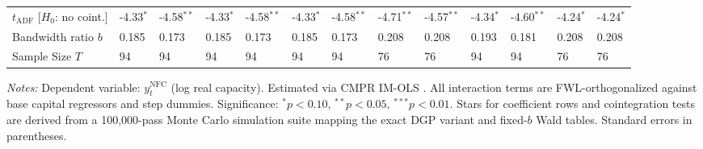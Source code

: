 \begin{table}[h!]
\begin{tabular}{p{3.2cm}p{1.0cm}p{1.0cm}p{1.0cm}p{1.0cm}p{1.0cm}p{1.0cm}p{1.0cm}p{1.0cm}p{1.0cm}p{1.0cm}p{1.0cm}p{1.0cm}}
		$t_{\text{ADF}}$ [$H_0$: no coint.] & -4.33$^{*}$ & -4.58$^{**}$ & -4.33$^{*}$ & -4.58$^{**}$ & -4.33$^{*}$ & -4.58$^{**}$ & -4.71$^{**}$ & -4.57$^{**}$ & -4.34$^{*}$ & -4.60$^{**}$ & -4.24$^{*}$ & -4.24$^{*}$ \\
		Bandwidth ratio $b$ & 0.185 & 0.173 & 0.185 & 0.173 & 0.185 & 0.173 & 0.208 & 0.208 & 0.193 & 0.181 & 0.208 & 0.208 \\
		Sample Size $T$ & 94 & 94 & 94 & 94 & 94 & 94 & 76 & 76 & 94 & 94 & 76 & 76 \\
		\bottomrule
	\end{tabular}
	\begin{minipage}{\textwidth}
		\scriptsize
		\textit{Notes:} Dependent variable: $y_t^{\text{NFC}}$ (log real capacity). Estimated via CMPR IM-OLS \citep{VogelsangWagner2024}. All interaction terms are FWL-orthogonalized against base capital regressors and step dummies. Significance: $^*p<0.10$, $^{**}p<0.05$, $^{***}p<0.01$. Stars for coefficient rows and cointegration tests are derived from a 100,000-pass Monte Carlo simulation suite mapping the exact DGP variant and fixed-$b$ Wald tables. Standard errors in parentheses.
	\end{minipage}
\end{table}


